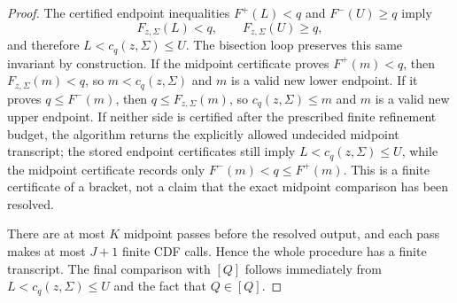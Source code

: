 \begin{proof}
The certified endpoint inequalities \(F^+(L)<q\) and \(F^-(U)\ge q\) imply
\[
F_{z,\Sigma}(L)<q,\qquad F_{z,\Sigma}(U)\ge q,
\]
and therefore \(L<c_q(z,\Sigma)\le U\).  The bisection loop preserves this
same invariant by construction.  If the midpoint certificate proves
\(F^+(m)<q\), then \(F_{z,\Sigma}(m)<q\), so \(m<c_q(z,\Sigma)\) and \(m\) is
a valid new lower endpoint.  If it proves \(q\le F^-(m)\), then
\(q\le F_{z,\Sigma}(m)\), so \(c_q(z,\Sigma)\le m\) and \(m\) is a valid new
upper endpoint.  If neither side is certified after the prescribed finite
refinement budget, the algorithm returns the explicitly allowed undecided
midpoint transcript; the stored endpoint certificates still imply
\(L<c_q(z,\Sigma)\le U\), while the midpoint certificate records only
\(F^-(m)<q\le F^+(m)\).  This is a finite certificate of a bracket, not a
claim that the exact midpoint comparison has been resolved.

There are at most \(K\) midpoint passes before the resolved output, and each
pass makes at most \(J+1\) finite CDF calls.  Hence the whole procedure has a
finite transcript.  The final comparison with \([Q]\) follows immediately
from \(L<c_q(z,\Sigma)\le U\) and the fact that \(Q\in[Q]\).
\end{proof}


